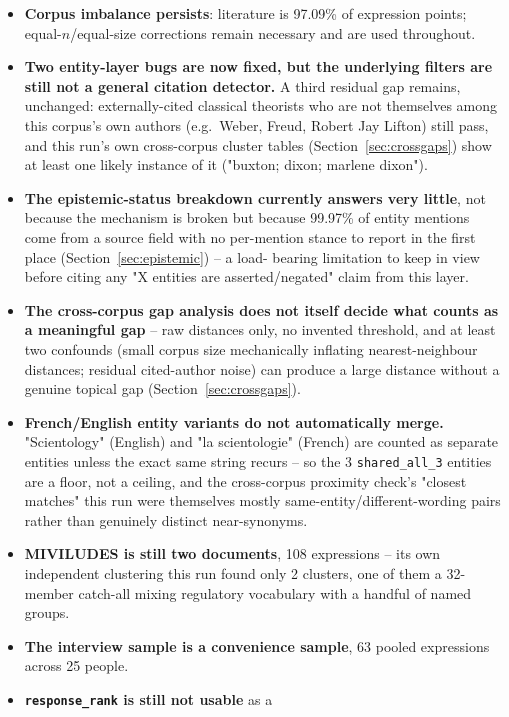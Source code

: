 \documentclass[11pt,a4paper]{article}
\begin{document}
\begin{itemize}[leftmargin=1.4em]
  \item \textbf{Corpus imbalance persists}: literature is 97.09\% of
  expression points; equal-$n$/equal-size corrections remain necessary
  and are used throughout.
  \item \textbf{Two entity-layer bugs are now fixed, but the underlying
  filters are still not a general citation detector.} A third residual
  gap remains, unchanged: externally-cited classical theorists who are
  not themselves among this corpus's own authors (e.g.\ Weber, Freud,
  Robert Jay Lifton) still pass, and this run's own cross-corpus cluster
  tables (Section~\ref{sec:crossgaps}) show at least one likely instance
  of it ("buxton; dixon; marlene dixon").
  \item \textbf{The epistemic-status breakdown currently answers very
  little}, not because the mechanism is broken but because 99.97\% of
  entity mentions come from a source field with no per-mention stance to
  report in the first place (Section~\ref{sec:epistemic}) -- a load-
  bearing limitation to keep in view before citing any
  "X entities are asserted/negated" claim from this layer.
  \item \textbf{The cross-corpus gap analysis does not itself decide
  what counts as a meaningful gap} -- raw distances only, no invented
  threshold, and at least two confounds (small corpus size mechanically
  inflating nearest-neighbour distances; residual cited-author noise)
  can produce a large distance without a genuine topical gap
  (Section~\ref{sec:crossgaps}).
  \item \textbf{French/English entity variants do not automatically
  merge.} "Scientology" (English) and "la scientologie" (French) are
  counted as separate entities unless the exact same string recurs -- so
  the 3 \texttt{shared\_all\_3} entities are a floor, not a ceiling, and
  the cross-corpus proximity check's "closest matches" this run were
  themselves mostly same-entity/different-wording pairs rather than
  genuinely distinct near-synonyms.
  \item \textbf{MIVILUDES is still two documents}, 108 expressions --
  its own independent clustering this run found only 2 clusters, one of
  them a 32-member catch-all mixing regulatory vocabulary with a handful
  of named groups.
  \item \textbf{The interview sample is a convenience sample}, 63 pooled
  expressions across 25 people.
  \item \textbf{\texttt{response\_rank} is still not usable} as a

\end{itemize}
\end{document}
